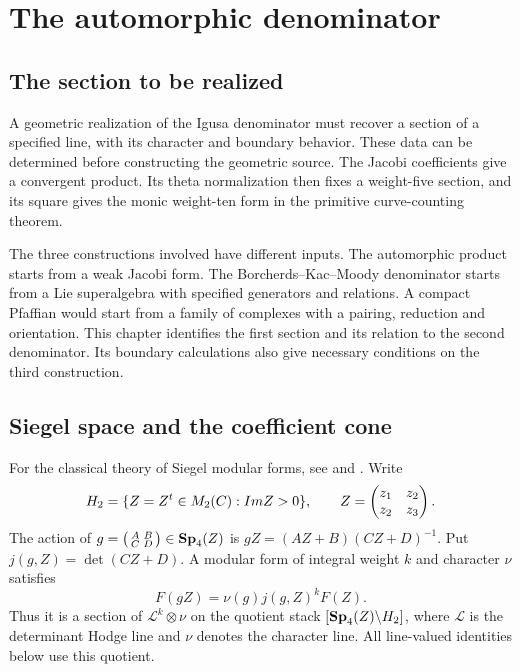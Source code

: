 \chapter{The automorphic denominator}
\label{ch:view1-automorphic}

\section{The section to be realized}
\label{sec:view1-pentadic-level}

A geometric realization of the Igusa denominator must recover a section
of a specified line, with its character and boundary behavior.  These
data can be determined before constructing the geometric source.  The
Jacobi coefficients give a convergent product.  Its theta normalization
then fixes a weight-five section, and its square gives the monic
weight-ten form in the primitive curve-counting theorem.

The three constructions involved have different inputs.  The
automorphic product starts from a weak Jacobi form.  The
Borcherds--Kac--Moody denominator starts from a Lie superalgebra with
specified generators and relations.  A compact Pfaffian would start
from a family of complexes with a pairing, reduction and orientation.
This chapter identifies the first section and its relation to the
second denominator.  Its boundary calculations also give necessary
conditions on the third construction.

\section{Siegel space and the coefficient cone}
\label{sec:view1-siegel-and-chamber}

For the classical theory of Siegel modular forms, see
\cite[Chapter I]{FREITAG:1} and \cite[\S\S2--3]{VDGEER:1}.
Write
\[
 H_2=\{Z=Z^t\in M_2(C):Im Z>0\},\qquad
 Z=\begin{pmatrix}z_1&z_2\\z_2&z_3\end{pmatrix}.
\]
The action of
\(g=\bigl(\begin{smallmatrix}A&B\\C&D\end{smallmatrix}\bigr)
\in\mathbf{Sp}_4(Z)\) is
\(gZ=(AZ+B)(CZ+D)^{-1}\).  Put \(j(g,Z)=\det(CZ+D)\).
A modular form of integral weight \(k\) and character \(\nu\) satisfies
\[
 F(gZ)=\nu(g)j(g,Z)^kF(Z).
\]
Thus it is a section of \(\mathcal L^k\otimes\nu\) on the quotient
stack \([\mathbf{Sp}_4(Z)\backslash H_2]\), where \(\mathcal L\)
is the determinant Hodge line and \(\nu\) denotes the character line.
All line-valued identities below use this quotient.

